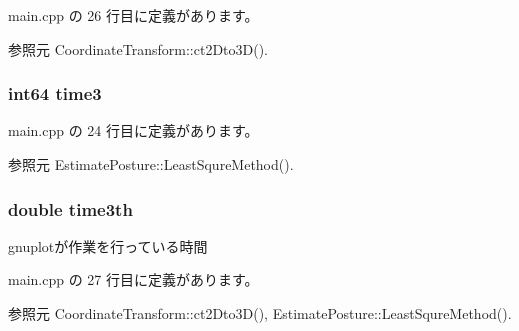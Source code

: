  main.\-cpp の 26 行目に定義があります。



参照元 Coordinate\-Transform\-::ct2\-Dto3\-D().

\subsubsection[{time3}]{\setlength{\rightskip}{0pt plus 5cm}int64 time3}\label{_estimate_posture_8h_a0dd5ee6f0df25198c4c8bd4d78c9f3a3}


 main.\-cpp の 24 行目に定義があります。



参照元 Estimate\-Posture\-::\-Least\-Squre\-Method().

\subsubsection[{time3th}]{\setlength{\rightskip}{0pt plus 5cm}double time3th}\label{_estimate_posture_8h_a1040aab8fcdc8e241d94175099912c50}


gnuplotが作業を行っている時間 



 main.\-cpp の 27 行目に定義があります。



参照元 Coordinate\-Transform\-::ct2\-Dto3\-D(), Estimate\-Posture\-::\-Least\-Squre\-Method().

